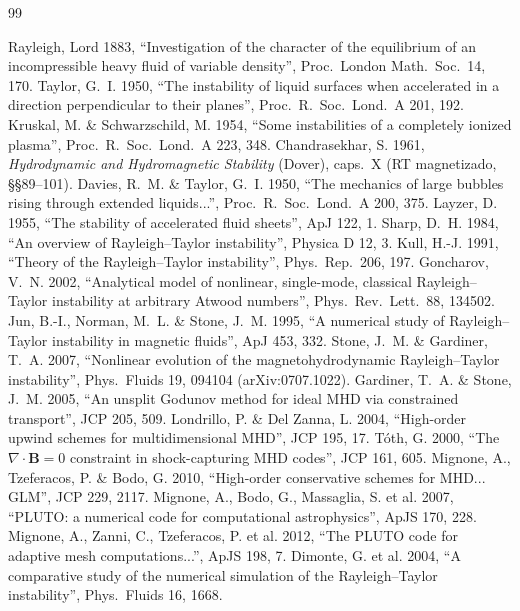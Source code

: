 \documentclass[11pt,a4paper]{article}
\newcommand{\B}{\mathbf{B}}
\begin{document}
\begin{thebibliography}{99}\small

 Rayleigh, Lord 1883, ``Investigation of the character of the equilibrium of an incompressible heavy fluid of variable density'', Proc.\ London Math.\ Soc.\ 14, 170.
 Taylor, G.~I. 1950, ``The instability of liquid surfaces when accelerated in a direction perpendicular to their planes'', Proc.\ R.\ Soc.\ Lond.\ A 201, 192.
 Kruskal, M. \& Schwarzschild, M. 1954, ``Some instabilities of a completely ionized plasma'', Proc.\ R.\ Soc.\ Lond.\ A 223, 348.
 Chandrasekhar, S. 1961, \emph{Hydrodynamic and Hydromagnetic Stability} (Dover), caps.~X (RT magnetizado, §§89--101).
 Davies, R.~M. \& Taylor, G.~I. 1950, ``The mechanics of large bubbles rising through extended liquids...'', Proc.\ R.\ Soc.\ Lond.\ A 200, 375.
 Layzer, D. 1955, ``The stability of accelerated fluid sheets'', ApJ 122, 1.
 Sharp, D.~H. 1984, ``An overview of Rayleigh--Taylor instability'', Physica D 12, 3.
 Kull, H.-J. 1991, ``Theory of the Rayleigh--Taylor instability'', Phys.\ Rep.\ 206, 197.
 Goncharov, V.~N. 2002, ``Analytical model of nonlinear, single-mode, classical Rayleigh--Taylor instability at arbitrary Atwood numbers'', Phys.\ Rev.\ Lett.\ 88, 134502.
 Jun, B.-I., Norman, M.~L. \& Stone, J.~M. 1995, ``A numerical study of Rayleigh--Taylor instability in magnetic fluids'', ApJ 453, 332.
 Stone, J.~M. \& Gardiner, T.~A. 2007, ``Nonlinear evolution of the magnetohydrodynamic Rayleigh--Taylor instability'', Phys.\ Fluids 19, 094104 (arXiv:0707.1022).
 Gardiner, T.~A. \& Stone, J.~M. 2005, ``An unsplit Godunov method for ideal MHD via constrained transport'', JCP 205, 509.
 Londrillo, P. \& Del Zanna, L. 2004, ``High-order upwind schemes for multidimensional MHD'', JCP 195, 17.
 T\'oth, G. 2000, ``The $\nabla\cdot\B=0$ constraint in shock-capturing MHD codes'', JCP 161, 605.
 Mignone, A., Tzeferacos, P. \& Bodo, G. 2010, ``High-order conservative schemes for MHD... GLM'', JCP 229, 2117.
 Mignone, A., Bodo, G., Massaglia, S. et al. 2007, ``PLUTO: a numerical code for computational astrophysics'', ApJS 170, 228.
 Mignone, A., Zanni, C., Tzeferacos, P. et al. 2012, ``The PLUTO code for adaptive mesh computations...'', ApJS 198, 7.
 Dimonte, G. et al. 2004, ``A comparative study of the numerical simulation of the Rayleigh--Taylor instability'', Phys.\ Fluids 16, 1668.

\end{thebibliography}
\end{document}
